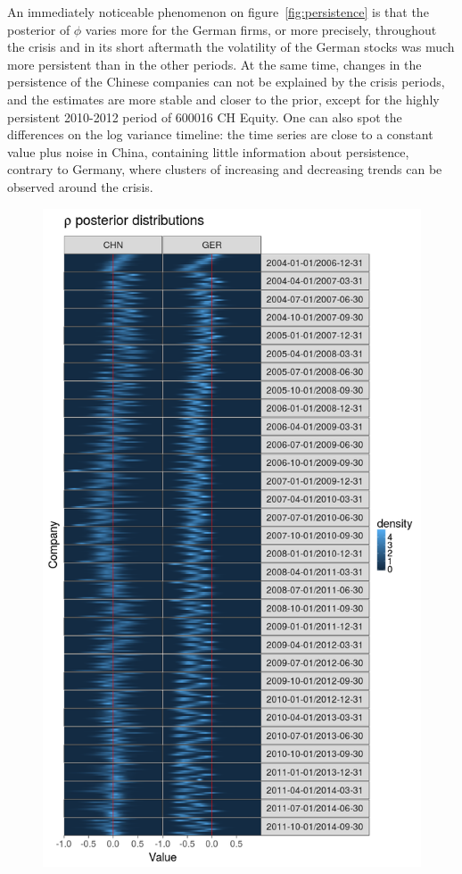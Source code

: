 An immediately noticeable phenomenon on figure~\ref{fig:persistence} is that the posterior of $\phi$ varies more for the German firms, or more precisely, throughout the crisis and in its short aftermath the volatility of the German stocks was much more persistent than in the other periods.
At the same time, changes in the persistence of the Chinese companies can not be explained by the crisis periods, and the estimates are more stable and closer to the prior, except for the highly persistent 2010-2012 period of 600016 CH Equity.
One can also spot the differences on the log variance timeline: the time series are close to a constant value plus noise in China, containing little information about persistence, contrary to Germany, where clusters of increasing and decreasing trends can be observed around the crisis.

\begin{figure}[p]
	\vspace*{-3.2cm}
	\centering
	\includegraphics[width=\linewidth]{../calculations/rhos}

\end{figure}
